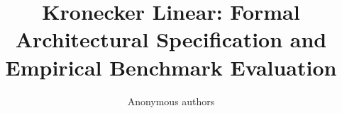 \title{\textbf{Kronecker Linear: Formal Architectural Specification and Empirical Benchmark Evaluation}}

\author{Anonymous authors}
